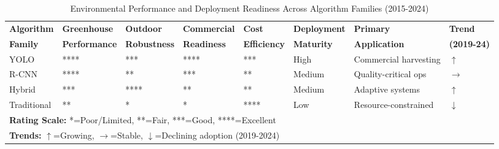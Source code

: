 \begin{table}[htbp]
\centering
\tiny  
\caption{Environmental Performance and Deployment Readiness Across Algorithm Families (2015-2024)}
\label{tab:deployment_readiness}
\begin{tabular}{p{1.5cm}p{1.2cm}p{1.2cm}p{1.2cm}p{1.5cm}p{1.5cm}p{1.8cm}p{1.2cm}}
\toprule
\textbf{Algorithm} & \textbf{Greenhouse} & \textbf{Outdoor} & \textbf{Commercial} & \textbf{Cost} & \textbf{Deployment} & \textbf{Primary} & \textbf{Trend} \\
\textbf{Family} & \textbf{Performance} & \textbf{Robustness} & \textbf{Readiness} & \textbf{Efficiency} & \textbf{Maturity} & \textbf{Application} & \textbf{(2019-24)} \\
\midrule
YOLO & **** & *** & **** & *** & High & Commercial harvesting & \textbf{$\uparrow$} \\
R-CNN & **** & ** & *** & ** & Medium & Quality-critical ops & $\rightarrow$ \\
Hybrid & *** & **** & ** & ** & Medium & Adaptive systems & $\uparrow$ \\
Traditional & ** & * & * & **** & Low & Resource-constrained & $\downarrow$ \\
\midrule
\multicolumn{8}{l}{\textbf{Rating Scale:} *=Poor/Limited, **=Fair, ***=Good, ****=Excellent} \\
\multicolumn{8}{l}{\textbf{Trends:} $\uparrow$=Growing, $\rightarrow$=Stable, $\downarrow$=Declining adoption (2019-2024)} \\
\bottomrule
\end{tabular}
\end{table}